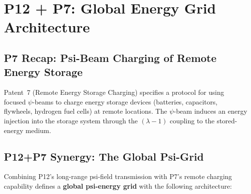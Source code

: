 \documentclass[aps,prd,twocolumn,superscriptaddress]{revtex4-2}
\begin{document}
\section{P12 + P7: Global Energy Grid Architecture}
\label{sec:global-grid}

\subsection{P7 Recap: Psi-Beam Charging of Remote Energy Storage}

Patent~7 (Remote Energy Storage Charging) specifies a protocol
for using focused $\psi$-beams to charge energy storage devices
(batteries, capacitors, flywheels, hydrogen fuel cells) at remote
locations.  The $\psi$-beam induces an energy injection into the storage
system through the $(\lambda-1)$ coupling to the stored-energy medium.

\subsection{P12+P7 Synergy: The Global Psi-Grid}

Combining P12's long-range psi-field transmission with P7's remote
charging capability defines a \textbf{global psi-energy grid} with
the following architecture:
\end{document}
